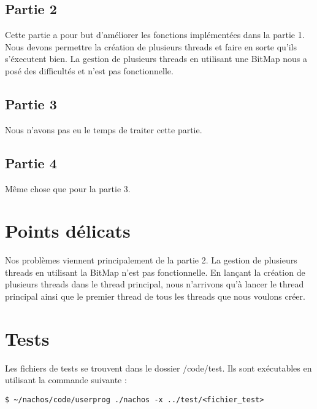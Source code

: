 \documentclass[a4paper]{article}
\begin{document}
\subsection{Partie 2}
Cette partie a pour but d'améliorer les fonctions implémentées dans la partie 1.
Nous devons permettre la création de plusieurs threads et faire en sorte qu'ils
s'éxecutent bien. La gestion de plusieurs threads en utilisant une BitMap nous a
posé des difficultés et n'est pas fonctionnelle.

\subsection{Partie 3}
Nous n'avons pas eu le temps de traiter cette partie.

\subsection{Partie 4}
Même chose que pour la partie 3.


\newpage
\section{Points délicats}

Nos problèmes viennent principalement de la partie 2. La gestion de plusieurs
threads en utilisant la BitMap n'est pas fonctionnelle. En lançant la création
de plusieurs threads dans le thread principal, nous n'arrivons qu'à lancer le
thread principal ainsi que le premier thread de tous les threads que nous
voulons créer.


\section{Tests}

Les fichiers de tests se trouvent dans le dossier /code/test. Ils sont exécutables
en utilisant la commande suivante :

\begin{verbatim}
$ ~/nachos/code/userprog ./nachos -x ../test/<fichier_test>
\end{verbatim}
\end{document}

